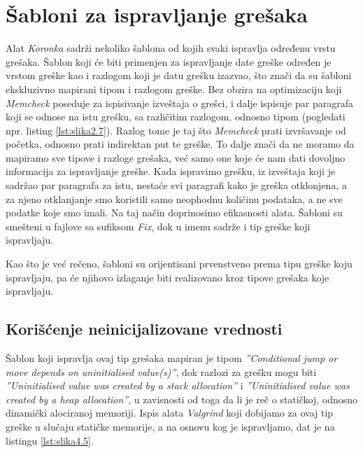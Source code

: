\documentclass[12pt,oneside]{memoir}
\theoremstyle{plain}
\theoremstyle{definition}
\begin{document}
\section{Šabloni za ispravljanje grešaka}
Alat \textit{Koronka} sadrži nekoliko šablona od kojih svaki ispravlja određenu vrstu grešaka. Šablon koji će biti primenjen za ispravljanje date greške određen je vrstom greške kao i razlogom koji je datu grešku izazvao, što znači da su šabloni ekskluzivno mapirani tipom i razlogom greške. Bez obzira na optimizaciju koji \textit{Memcheck} poseduje za ispisivanje izveštaja o grešci, i dalje ispisuje par paragrafa koji se odnose na istu grešku, sa različitim razlogom, odnosno tipom (pogledati npr. listing \ref{lst:slika2.7}). Razlog tome je taj što \textit{Memcheck} prati izvršavanje od početka, odnosno prati indirektan put te greške. To dalje znači da ne moramo da mapiramo sve tipove i razloge grešaka, već samo one koje će nam dati dovoljno informacija za ispravljanje greške. Kada ispravimo grešku, iz izveštaja koji je sadržao par paragrafa za istu, nestaće svi paragrafi kako je greška otklonjena, a za njeno otklanjanje smo koristili samo neophodnu količinu podataka, a ne sve podatke koje smo imali. Na taj način doprinosimo efikasnosti alata. Šabloni su smešteni u fajlove sa sufiksom \textit{Fix}, dok u imenu sadrže i tip greške koji ispravljaju. 

Kao što je već rečeno, šabloni su orijentisani prvenstveno prema tipu greške koju ispravljaju, pa će njihovo izlaganje biti realizovano kroz tipove grešaka koje ispravljaju. 

\subsection{Korišćenje neinicijalizovane vrednosti}
Šablon koji ispravlja ovaj tip grešaka mapiran je tipom \textit{''Conditional jump or move depends on uninitialised value(s)''}, dok razlozi za grešku mogu biti \textit{''Uninitialised value was created by a stack allocation''} i \textit{''Uninitialised value was created by a heap allocation''}, u zavisnosti od toga da li je reč o statičkoj, odnosno dinamički alociranoj memoriji. Ispis alata \textit{Valgrind} koji dobijamo za ovaj tip greške u slučaju statičke memorije, a na osnovu kog je ispravljamo, dat je na listingu \ref{lst:slika4.5}.

\end{document}
